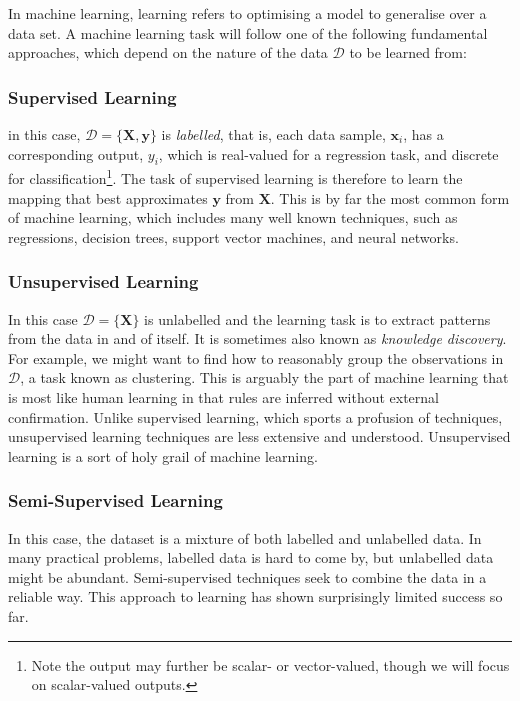 \documentclass[11pt]{amsart}
\begin{document}
In machine learning, learning refers to optimising a model to generalise over a data set. A machine learning task will follow one of the following fundamental approaches, which depend on the nature of the data $\mathcal{D}$ to be learned from:

\subsubsection{Supervised Learning}

in this case, $\mathcal{D} = \{\mathbf{X}, \mathbf{y}\}$ is \emph{labelled}, that is, each data sample, $\mathbf{x}_i$, has a corresponding output, $y_i$, which is real-valued for a regression task, and discrete for classification\footnote{Note the output may further be scalar- or vector-valued, though we will focus on scalar-valued outputs.}. The task of supervised learning is therefore to learn the mapping that best approximates $\mathbf{y}$ from $\mathbf{X}$. This is by far the most common form of machine learning, which includes many well known techniques, such as regressions, decision trees, support vector machines, and neural networks.

\subsubsection{Unsupervised Learning}

In this case $\mathcal{D} = \{\mathbf{X}\}$ is unlabelled and the learning task is to extract patterns from the data in and of itself. It is sometimes also known as \emph{knowledge discovery}. For example, we might want to find how to reasonably group the observations in $\mathcal{D}$, a task known as clustering. This is arguably the part of machine learning that is most like human learning in that rules are inferred without external confirmation. Unlike supervised learning, which sports a profusion of techniques, unsupervised learning techniques are less extensive and understood. Unsupervised learning is a sort of holy grail of machine learning.

\subsubsection{Semi-Supervised Learning}

In this case, the dataset is a mixture of both labelled and unlabelled data. In many practical problems, labelled data is hard to come by, but unlabelled data might be abundant. Semi-supervised techniques seek to combine the data in a reliable way. This approach to learning has shown surprisingly limited success so far.
\end{document}
